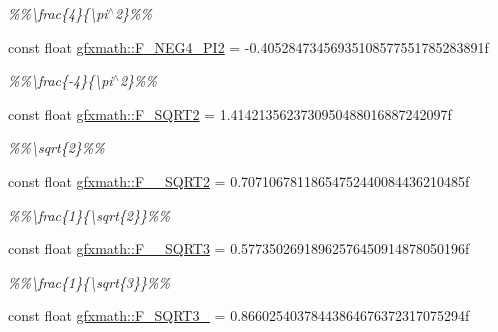 \begin{DoxyCompactItemize}
\begin{DoxyCompactList}\small\item\em \%\%\textbackslash{}frac\{4\}\{\textbackslash{}pi$^\wedge$2\}\%\% \end{DoxyCompactList}\item 
\hypertarget{group___scalar_math_consts_ga197e5a6509678e965eefa2f9dbc395c6}{}const float \hyperlink{group___scalar_math_consts_ga197e5a6509678e965eefa2f9dbc395c6}{gfxmath\+::\+F\+\_\+\+N\+E\+G4\+\_\+\+P\+I2} = -\/0.\+40528473456935108577551785283891f\label{group___scalar_math_consts_ga197e5a6509678e965eefa2f9dbc395c6}

\begin{DoxyCompactList}\small\item\em \%\%\textbackslash{}frac\{-\/4\}\{\textbackslash{}pi$^\wedge$2\}\%\% \end{DoxyCompactList}\item 
\hypertarget{group___scalar_math_consts_ga43677e4b78975d594a04bc8dadedbc60}{}const float \hyperlink{group___scalar_math_consts_ga43677e4b78975d594a04bc8dadedbc60}{gfxmath\+::\+F\+\_\+\+S\+Q\+R\+T2} = 1.\+4142135623730950488016887242097f\label{group___scalar_math_consts_ga43677e4b78975d594a04bc8dadedbc60}

\begin{DoxyCompactList}\small\item\em \%\%\textbackslash{}sqrt\{2\}\%\% \end{DoxyCompactList}\item 
\hypertarget{group___scalar_math_consts_ga068bdf7e4cc23958b4a0ff5807e830b9}{}const float \hyperlink{group___scalar_math_consts_ga068bdf7e4cc23958b4a0ff5807e830b9}{gfxmath\+::\+F\+\_\+\_\+\+S\+Q\+R\+T2} = 0.\+70710678118654752440084436210485f\label{group___scalar_math_consts_ga068bdf7e4cc23958b4a0ff5807e830b9}

\begin{DoxyCompactList}\small\item\em \%\%\textbackslash{}frac\{1\}\{\textbackslash{}sqrt\{2\}\}\%\% \end{DoxyCompactList}\item 
\hypertarget{group___scalar_math_consts_gad8ae4d5759b4629d01fb9f58a4b4b331}{}const float \hyperlink{group___scalar_math_consts_gad8ae4d5759b4629d01fb9f58a4b4b331}{gfxmath\+::\+F\+\_\+\_\+\+S\+Q\+R\+T3} = 0.\+57735026918962576450914878050196f\label{group___scalar_math_consts_gad8ae4d5759b4629d01fb9f58a4b4b331}

\begin{DoxyCompactList}\small\item\em \%\%\textbackslash{}frac\{1\}\{\textbackslash{}sqrt\{3\}\}\%\% \end{DoxyCompactList}\item 
\hypertarget{group___scalar_math_consts_ga3fef44c3a45acdde18067f03eb073098}{}const float \hyperlink{group___scalar_math_consts_ga3fef44c3a45acdde18067f03eb073098}{gfxmath\+::\+F\+\_\+\+S\+Q\+R\+T3\+\_} = 0.\+86602540378443864676372317075294f\label{group___scalar_math_consts_ga3fef44c3a45acdde18067f03eb073098}


\end{DoxyCompactItemize}
